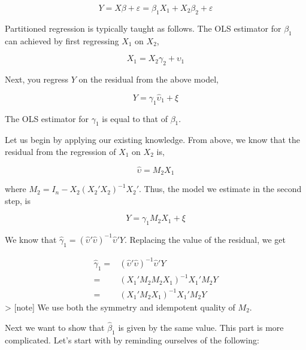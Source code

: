 \documentclass[
  letterpaper,
  DIV=11,
  numbers=noendperiod]{scrreprt}
\begin{document}
\[
Y = X\beta+ \varepsilon =\beta_1X_1+X_2\beta_2+\varepsilon
\]

Partitioned regression is typically taught as follows. The OLS estimator
for \(\beta_1\) can achieved by first regressing \(X_1\) on \(X_2\),

\[
X_1 = X_2\gamma_2+\upsilon_1
\]

Next, you regress \(Y\) on the residual from the above model,

\[
Y = \gamma_1 \hat{\upsilon}_1+\xi
\]

The OLS estimator for \(\gamma_1\) is equal to that of \(\beta_1\).

Let us begin by applying our existing knowledge. From above, we know
that the residual from the regression of \(X_1\) on \(X_2\) is,

\[
\hat{\upsilon} = M_2X_1
\]

where \(M_2 = I_n-X_2(X_2'X_2)^{-1}X_2'\). Thus, the model we estimate
in the second step, is

\[
Y = \gamma_1M_2X_1+\xi
\]

We know that
\(\hat{\gamma}_1 = (\hat{\upsilon}'\hat{\upsilon})^{-1}\hat{\upsilon}'Y\).
Replacing the value of the residual, we get

\[
\begin{align}
\hat{\gamma}_1 =& (\hat{\upsilon}'\hat{\upsilon})^{-1}\hat{\upsilon}'Y \\
=&(X_1'M_2M_2X_1)^{-1}X_1'M_2Y \\
=&(X_1'M_2X_1)^{-1}X_1'M_2Y
\end{align}
\] \textgreater{} {[}note{]} We use both the symmetry and idempotent
quality of \(M_2\).

Next we want to show that \(\hat{\beta}_1\) is given by the same value.
This part is more complicated. Let's start with by reminding ourselves
of the following:
\end{document}
